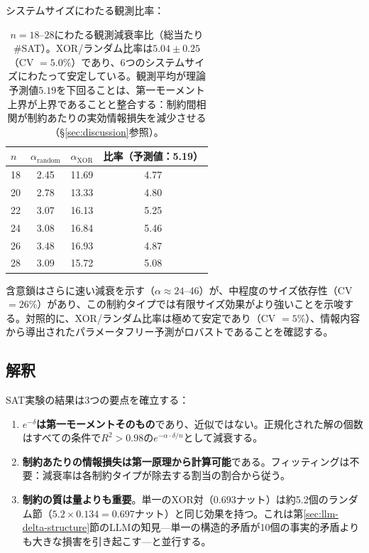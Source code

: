 \documentclass[11pt,a4paper]{article}
\begin{document}
システムサイズにわたる観測比率：

\begin{table}[htbp]
\centering
\begin{tabular}{lccc}
\toprule
$n$ & $\alpha_{\text{random}}$ & $\alpha_{\text{XOR}}$ & 比率（予測値：5.19） \\
\midrule
18 & 2.45 & 11.69 & 4.77 \\
20 & 2.78 & 13.33 & 4.80 \\
22 & 3.07 & 16.13 & 5.25 \\
24 & 3.08 & 16.84 & 5.46 \\
26 & 3.48 & 16.93 & 4.87 \\
28 & 3.09 & 15.72 & 5.08 \\
\bottomrule
\end{tabular}
\caption{$n = 18$--$28$にわたる観測減衰率比（総当たり\#SAT）。XOR/ランダム比率は$5.04 \pm 0.25$（CV $= 5.0\%$）であり、6つのシステムサイズにわたって安定している。観測平均が理論予測値$5.19$を下回ることは、第一モーメント上界が上界であることと整合する：制約間相関が制約あたりの実効情報損失を減少させる（\S\ref{sec:discussion}参照）。}
\label{tab:ratio}
\end{table}

含意鎖はさらに速い減衰を示す（$\alpha \approx 24$--46）が、中程度のサイズ依存性（CV $= 26\%$）があり、この制約タイプでは有限サイズ効果がより強いことを示唆する。対照的に、XOR/ランダム比率は極めて安定であり（CV $= 5\%$）、情報内容から導出されたパラメータフリー予測がロバストであることを確認する。

\subsection{解釈}

SAT実験の結果は3つの要点を確立する：

\begin{enumerate}
    \item \textbf{$e^{-\delta}$は第一モーメントそのもの}であり、近似ではない。正規化された解の個数はすべての条件で$R^2 > 0.98$の$e^{-\alpha \cdot \delta/n}$として減衰する。
    \item \textbf{制約あたりの情報損失は第一原理から計算可能}である。フィッティングは不要：減衰率は各制約タイプが除去する割当の割合から従う。
    \item \textbf{制約の質は量よりも重要}。単一のXOR対（$0.693$ナット）は約5.2個のランダム節（$5.2 \times 0.134 = 0.697$ナット）と同じ効果を持つ。これは第\ref{sec:llm-delta-structure}節のLLMの知見---単一の構造的矛盾が10個の事実的矛盾よりも大きな損害を引き起こす---と並行する。
\end{enumerate}
\end{document}
